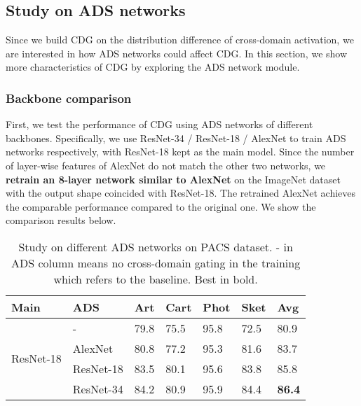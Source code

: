 \subsection{Study on ADS networks}
Since we build CDG on the distribution difference of cross-domain activation, we are interested in how ADS networks could affect CDG. In this section, we show more characteristics of CDG by exploring the ADS network module.

\subsubsection{Backbone comparison}
First, we test the performance of CDG using ADS networks of different backbones. Specifically, we use ResNet-34 / ResNet-18 / AlexNet to train ADS networks respectively, with ResNet-18 kept as the main model. Since the number of layer-wise features of AlexNet do not match the other two networks, we \textbf{retrain an 8-layer network similar to AlexNet} on the ImageNet dataset with the output shape coincided with ResNet-18. The retrained AlexNet achieves the comparable performance compared to the original one. We show the comparison results below.


\begin{table}[htb]
  \caption{Study on different ADS networks on PACS dataset. - in ADS column means no cross-domain gating in the training which refers to the baseline. Best in bold.}
  \label{tab:expand}
  \begin{center}
    \begin{tabularx}{0.5\textwidth}{p{}<{\centering}|p{}<{\centering}|X<{\centering}|X<{\centering}|X<{\centering}|X<{\centering}|X<{\centering}}

      \toprule[0.6pt]
      Main                          & ADS               & Art           & Cart             & Phot             & Sket          & Avg       \\
      \midrule[0.4pt]
      \multirow{4}{*}{ResNet-18}  & -                      & 79.8          & 75.5          & 95.8          & 72.5          & 80.9          \\
                                  & AlexNet                & 80.8          & 77.2          & 95.3          & 81.6          & 83.7          \\
                                  & ResNet-18              & 83.5          & 80.1          & 95.6          & 83.8          & 85.8          \\
                                  & ResNet-34              & 84.2          & 80.9          & 95.9          & 84.4          & \textbf{86.4} \\       

      \bottomrule[0.6pt]
    \end{tabularx}
  \end{center}
\end{table}


